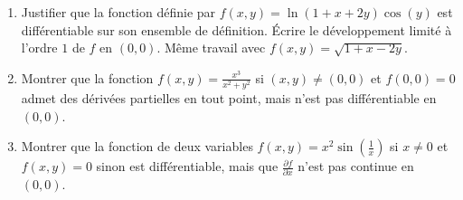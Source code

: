 \documentclass[11pt, class=report,crop=false]{standalone}
\begin{document}
\begin{miniexercices}
\sauteligne
\begin{enumerate}
  \item Justifier que la fonction définie par 
  $f(x,y) =  \ln(1+x+2y)\cos(y)$ est différentiable sur son ensemble de définition. \'Ecrire le développement limité à l'ordre $1$ de $f$ en $(0,0)$. Même travail avec $f(x,y) = \sqrt{1+x-2y}$.

  \item Montrer que la fonction
$f(x,y) = \frac{x^3}{x^2 + y^2}$ si $(x,y) \neq (0,0)$ et $f(0,0)=0$
admet des dérivées partielles en tout point, mais n'est pas différentiable en $(0,0)$.


  \item Montrer que la fonction de deux variables
$f(x,y) = x^2\sin \left(\frac{1}{x}\right)$ si $x \neq 0$ et $f(x,y) = 0$ sinon
 est différentiable, mais que $\frac{\partial f}{\partial x}$ n'est pas continue en $(0,0)$.
 
\end{enumerate}
\end{miniexercices}


\finchapitre 
\end{document}

